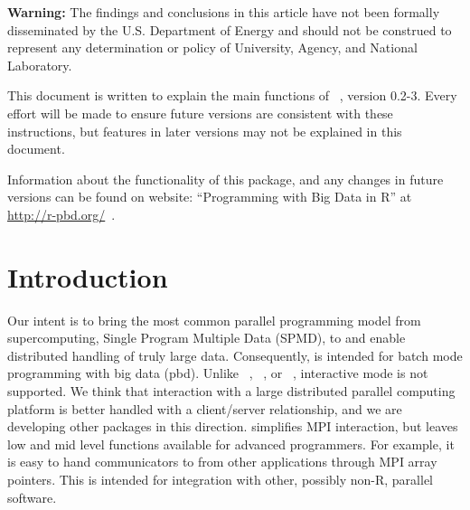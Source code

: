 
{\color{red} \bf Warning:}
The findings and conclusions in this article have not been
formally disseminated by the U.S. Department of Energy
and should not be construed to represent any determination or
policy of University, Agency, and National Laboratory.

This document is written to explain the main
functions of ~\citep{Chen2012}, version 0.2-3.
Every effort will be made to ensure future versions are consistent with
these instructions, but features in later versions may not be explained
in this document.

Information about the functionality of this package,
and any changes in future versions can be found on website:
``Programming with Big Data in R'' at
\url{http://r-pbd.org/}~\citep{pbdR2012}.




\section[Introduction]{Introduction}
\label{sec:introduction}

Our intent is to bring the most common parallel programming model from
supercomputing, Single Program Multiple Data (SPMD), to 
and enable distributed handling of truly large data. Consequently,
 is intended for batch mode programming with big data
(pbd). Unlike ~\citep{Yu2002},
~\citep{Tierney2012}, or ~\citep{Rcore},
interactive mode is not supported.  We think that interaction with a
large distributed parallel computing platform is better handled with a
client/server relationship, and we are developing other packages in
this direction.   simplifies MPI interaction, but leaves
low and mid level functions available for advanced programmers. For
example, it is easy to hand communicators to  from other
applications through MPI array pointers. This is intended for
integration with other, possibly non-R, parallel software.


